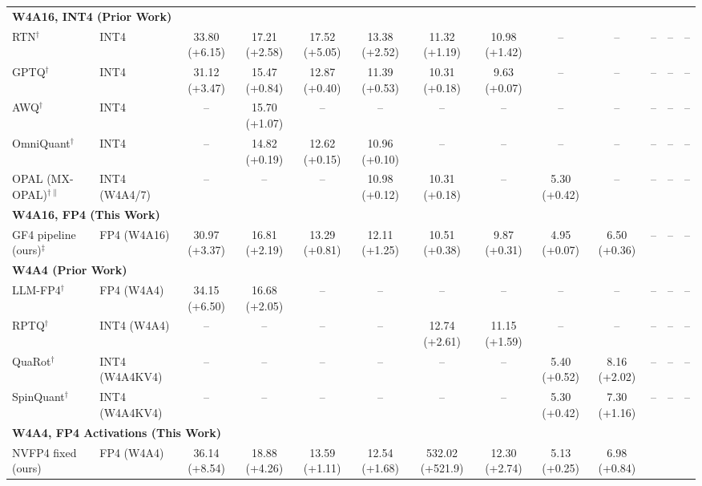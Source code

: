 \begin{table}[t]
\begin{tabular}{llccccccccccc}
\midrule
\multicolumn{13}{l}{\textbf{W4A16, INT4 (Prior Work)}} \\
RTN$^\dagger$
  & INT4
  & 33.80 (+6.15) & 17.21 (+2.58) & 17.52 (+5.05) & 13.38 (+2.52)
  & 11.32 (+1.19) & 10.98 (+1.42) & -- & -- & -- & -- & -- \\
GPTQ$^\dagger$~\cite{frantar2023gptq}
  & INT4
  & 31.12 (+3.47) & 15.47 (+0.84) & 12.87 (+0.40) & 11.39 (+0.53)
  & 10.31 (+0.18) & 9.63 (+0.07) & -- & -- & -- & -- & -- \\
AWQ$^\dagger$~\cite{lin2023awq}
  & INT4
  & -- & 15.70 (+1.07) & -- & -- & -- & -- & -- & -- & -- & -- & -- \\
OmniQuant$^\dagger$~\cite{shao2023omniquant}
  & INT4
  & -- & 14.82 (+0.19) & 12.62 (+0.15) & 10.96 (+0.10)
  & -- & -- & -- & -- & -- & -- & -- \\
OPAL (MX-OPAL)$^{\dagger\parallel}$~\cite{koo2024opal}
  & INT4 (W4A4/7)
  & -- & -- & -- & 10.98 (+0.12)
  & 10.31 (+0.18) & -- & 5.30 (+0.42) & -- & -- & -- & -- \\
\midrule
\multicolumn{13}{l}{\textbf{W4A16, FP4 (This Work)}} \\
GF4 pipeline (ours)$^\ddagger$
  & FP4 (W4A16)
  & 30.97 (+3.37) & 16.81 (+2.19) & 13.29 (+0.81) & 12.11 (+1.25)
  & 10.51 (+0.38) & 9.87 (+0.31) & 4.95 (+0.07) & 6.50 (+0.36)
  & -- & -- & -- \\
\midrule
\multicolumn{13}{l}{\textbf{W4A4 (Prior Work)}} \\
LLM-FP4$^\dagger$~\cite{liu2023llmfp4}
  & FP4 (W4A4)
  & 34.15 (+6.50) & 16.68 (+2.05) & -- & -- & -- & -- & -- & -- & -- & -- & -- \\
RPTQ$^\dagger$~\cite{yuan2023rptq}
  & INT4 (W4A4)
  & -- & -- & -- & -- & 12.74 (+2.61) & 11.15 (+1.59) & -- & -- & -- & -- & -- \\
QuaRot$^\dagger$~\cite{quarot2024}
  & INT4 (W4A4KV4)
  & -- & -- & -- & -- & -- & -- & 5.40 (+0.52) & 8.16 (+2.02) & -- & -- & -- \\
SpinQuant$^\dagger$~\cite{liu2025spinquant}
  & INT4 (W4A4KV4)
  & -- & -- & -- & -- & -- & -- & 5.30 (+0.42) & 7.30 (+1.16) & -- & -- & -- \\
\midrule
\multicolumn{13}{l}{\textbf{W4A4, FP4 Activations (This Work)}} \\
NVFP4 fixed (ours)
  & FP4 (W4A4)
  & 36.14 (+8.54) & 18.88 (+4.26) & 13.59 (+1.11) & 12.54 (+1.68)
  & 532.02 (+521.9) & 12.30 (+2.74) & 5.13 (+0.25) & 6.98 (+0.84)

\end{tabular}
\end{table}
